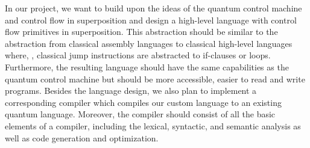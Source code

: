 In our project, we want to build upon the ideas of the quantum control machine and control flow in superposition and design a high-level language with control flow primitives in superposition. This abstraction should be similar to the abstraction from classical assembly languages to classical high-level languages where, \eg, classical jump instructions are abstracted to if-clauses or loops. Furthermore, the resulting language should have the same capabilities as the quantum control machine but should be more accessible, \ie easier to read and write programs.
Besides the language design, we also plan to implement a corresponding compiler which compiles our custom language to an existing quantum language. Moreover, the compiler should consist of all the basic elements of a compiler, including the lexical, syntactic, and semantic analysis as well as code generation and optimization.